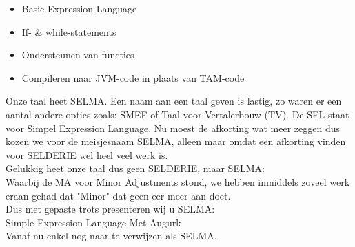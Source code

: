 \documentclass[]{article}
\begin{document}
\begin{itemize}
\item Basic Expression Language
\item If- \& while-statements
\item Ondersteunen van functies
\item Compileren naar JVM-code in plaats van TAM-code
\end{itemize}

Onze taal heet SELMA. Een naam aan een taal geven is lastig, zo waren er een aantal andere opties zoals: SMEF of Taal voor Vertalerbouw (TV).
De SEL staat voor Simpel Expression Language. Nu moest de afkorting wat meer zeggen dus kozen we voor de meisjesnaam SELMA, alleen maar omdat een afkorting vinden voor SELDERIE wel heel veel werk is.\\
Gelukkig heet onze taal dus geen SELDERIE, maar SELMA:\\
Waarbij de MA voor Minor Adjustments stond, we hebben inmiddels zoveel werk eraan gehad dat "Minor" dat geen eer meer aan doet. \\
Dus met gepaste trots presenteren wij u SELMA:\\
Simple Expression Language Met Augurk\\
Vanaf nu enkel nog naar te verwijzen als SELMA.\\

\newpage
\end{document}
